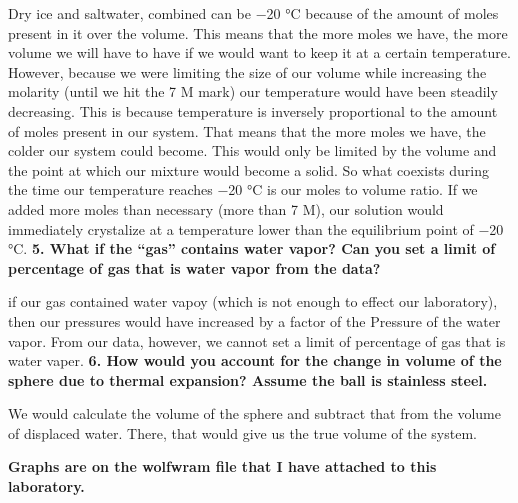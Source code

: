 \documentclass[12pt]{report}
\begin{document}
	Dry ice and saltwater, combined can be −20 °C because of the amount of moles present in it over the volume. This means that the more moles we have, the more volume we will have to have if we would want to keep it at a certain temperature.  However, because we were limiting the size of our volume while increasing the molarity (until we hit the 7 M mark) our temperature would have been steadily decreasing. This is because temperature is inversely proportional to the amount of moles present in our system. That means that the more moles we have, the colder our system could become. This would only be limited by the volume and the point at which our mixture would become a solid. 
	So what coexists during the time our temperature reaches −20 °C is our moles to volume ratio. If we added more moles than necessary (more than 7 M), our solution would immediately crystalize at a temperature lower than the equilibrium point of −20 °C.
	\textbf{5. What if the “gas” contains water vapor? Can you set a limit of percentage of gas that is water vapor from the data?}

	if our gas contained water vapoy (which is not enough to effect our laboratory), then our pressures would have increased by a factor of the Pressure of the water vapor. From our data, however, we cannot set a limit of percentage of gas that is water vaper.
	\textbf{6. How would you account for the change in volume of the sphere due to thermal expansion? Assume the ball is stainless steel.}

	We would calculate the volume of the sphere and subtract that from the volume of displaced water. There, that would give us the true volume of the system.


	\textbf{Graphs are on the wolfwram file that I have attached to this laboratory.}
	
\end{document}
